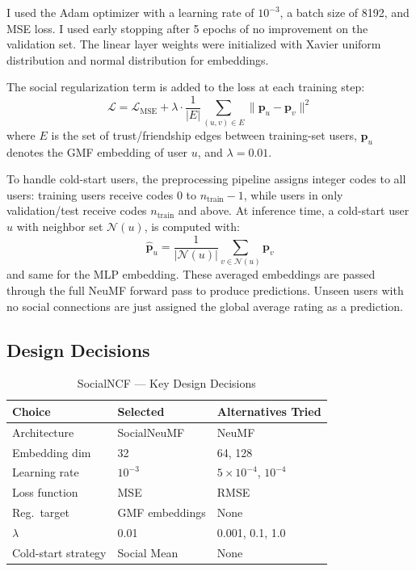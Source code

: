 \documentclass[conference]{IEEEtran}
\begin{document}
I used the Adam optimizer with a learning rate of $10^{-3}$, a batch size of
8192, and MSE loss. I used early stopping after 5
epochs of no improvement on the validation set. The linear layer weights were
initialized with Xavier uniform distribution and normal distribution for
embeddings.

The social regularization term is added to the loss at each training step:
\begin{equation}
  \mathcal{L} = \mathcal{L}_{\text{MSE}} + \lambda \cdot \frac{1}{|E|} \sum_{(u,v) \in E} \|\mathbf{p}_u - \mathbf{p}_v\|^2
\end{equation}
where $E$ is the set of trust/friendship edges between training-set users, 
$\mathbf{p}_u$ denotes the GMF embedding of user $u$, and $\lambda = 0.01$.

To handle cold-start users, the preprocessing pipeline assigns integer codes to 
all users: training users receive codes $0$ to $n_{\text{train}}-1$, while 
users in only validation/test receive codes $n_{\text{train}}$ and above. At 
inference time, a cold-start user $u$ with neighbor set $\mathcal{N}(u)$, is
computed with:
\begin{equation}
  \hat{\mathbf{p}}_u = \frac{1}{|\mathcal{N}(u)|} \sum_{v \in \mathcal{N}(u)} \mathbf{p}_v
\end{equation}
and same for the MLP embedding. These averaged embeddings are passed through 
the full NeuMF forward pass to produce predictions. Unseen users with no social
connections are just assigned the global average rating as a prediction.

\subsection{Design Decisions}

\begin{table}[htbp]
\caption{SocialNCF --- Key Design Decisions}
\label{tab:decisions-social-ncf}
\centering
\begin{tabular}{p{2.5cm}p{2.5cm}p{2.5cm}}
\toprule
\textbf{Choice} & \textbf{Selected} & \textbf{Alternatives Tried} \\
\midrule
Architecture & SocialNeuMF & NeuMF \\
Embedding dim & 32 & 64, 128 \\
Learning rate & $10^{-3}$ & $5\times10^{-4}$, $10^{-4}$ \\
Loss function & MSE & RMSE \\
Reg.\ target & GMF embeddings & None \\
$\lambda$ & 0.01 & 0.001, 0.1, 1.0 \\
Cold-start strategy & Social Mean & None \\
\bottomrule
\end{tabular}
\end{table}
\end{document}
